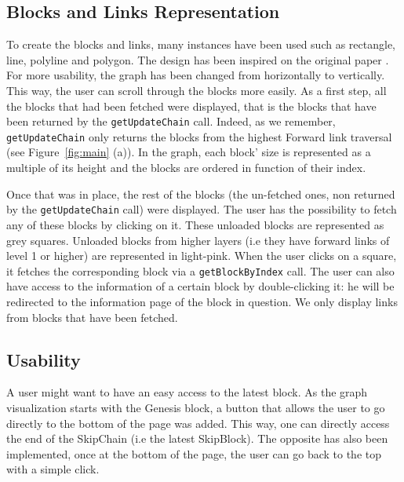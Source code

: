 \documentclass[11pt, a4paper, twoside, openright]{article} %
\begin{document}
{\subsection{Blocks and Links Representation}
To create the blocks and links, many instances have been used such as rectangle, line, polyline and polygon. The design has been inspired on the original paper \cite{paper}. For more usability, the graph has been changed from horizontally to vertically. This way, the user can scroll through the blocks more easily.
As a first step, all the blocks that had been fetched were displayed, that is the blocks that have been returned by the \verb|getUpdateChain| call. Indeed, as we remember, \verb|getUpdateChain| only returns the blocks from the highest Forward link traversal (see Figure~\ref{fig:main} (a)). In the graph, each block' size is represented as a multiple of its height and the blocks are ordered in function of their index. 

Once that was in place, the rest of the blocks (the un-fetched ones, non returned by the \verb|getUpdateChain| call) were displayed. The user has the possibility to fetch any of these blocks by clicking on it. These unloaded blocks are represented as grey squares. Unloaded blocks from higher layers (i.e they have forward links of level 1 or higher) are represented in light-pink. When the user clicks on a square, it fetches the corresponding block via a \verb|getBlockByIndex| call. The user can also have access to the information of a certain block by double-clicking it: he will be redirected to the information page of the  block in question.
We only display links from blocks that have been fetched.

\subsection{Usability}
A user might want to have an easy access to the latest block. As the graph visualization starts with the Genesis block, a button that allows the user to go directly to the bottom of the page was added. This way, one can directly access the end of the SkipChain (i.e the latest SkipBlock). The opposite has also been implemented, once at the bottom of the page, the user can go back to the top with a simple click.

}
\end{document}
